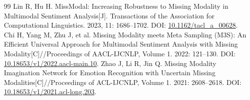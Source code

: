 \documentclass[UTF8,a4paper,11pt]{ctexart}
\newcounter{q2algorithm}
\begin{document}
{\begin{thebibliography}{99}
 Lin R, Hu H. MissModal: Increasing Robustness to Missing Modality in Multimodal Sentiment Analysis[J]. Transactions of the Association for Computational Linguistics. 2023, 11: 1686--1702. DOI: \url{10.1162/tacl_a_00628}.
 Chi H, Yang M, Zhu J, et al. Missing Modality meets Meta Sampling (M3S): An Efficient Universal Approach for Multimodal Sentiment Analysis with Missing Modality[C]//Proceedings of AACL-IJCNLP, Volume 1. 2022: 121--130. DOI: \url{10.18653/v1/2022.aacl-main.10}.
 Zhao J, Li R, Jin Q. Missing Modality Imagination Network for Emotion Recognition with Uncertain Missing Modalities[C]//Proceedings of ACL-IJCNLP, Volume 1. 2021: 2608--2618. DOI: \url{10.18653/v1/2021.acl-long.203}.
\end{thebibliography}
}
\end{document}
